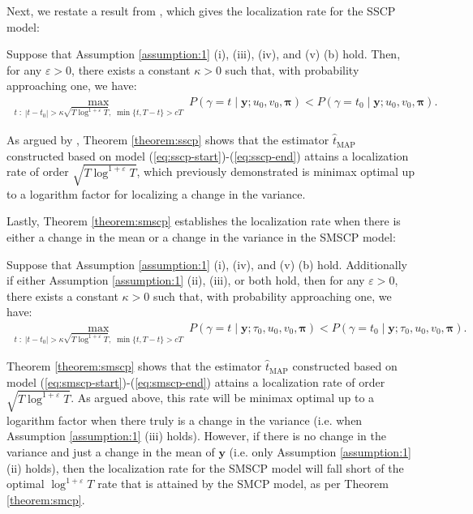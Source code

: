 Next, we restate a result from \cite{Cappello22}, which gives the localization rate for the SSCP model: 
\begin{theorem}\label{theorem:sscp}
    Suppose that Assumption \ref{assumption:1} (i), (iii), (iv), and (v) (b) hold. Then, for any $\varepsilon > 0$, there exists a constant $\kappa > 0$ such that, with probability approaching one, we have:
    \begin{align*}
        \max_{t \;:\; |t - t_0| > \kappa \sqrt{T\log^{1+\varepsilon} T},\;\min\{t,T-t\} > cT} \; P(\gamma = t  \;|\; \mathbf{y} ; u_0,v_0,\pmb{\pi}) < P(\gamma = t_0  \;|\; \mathbf{y} ; u_0,v_0,\pmb{\pi}).
    \end{align*}
\end{theorem}
As argued by \cite{Cappello22}, Theorem \ref{theorem:sscp} shows that the estimator $\hat{t}_{\text{MAP}}$ constructed based on model (\ref{eq:sscp-start})-(\ref{eq:sscp-end}) attains a localization rate of order $\sqrt{T\log^{1+\varepsilon} T}$, which \cite{Wang21} previously demonstrated is minimax optimal up to a logarithm factor for localizing a change in the variance.

Lastly, Theorem \ref{theorem:smscp} establishes the localization rate when there is either a change in the mean or a change in the variance in the SMSCP model:
\begin{theorem}\label{theorem:smscp}
Suppose that Assumption \ref{assumption:1} (i), (iv), and (v) (b) hold. Additionally if either Assumption \ref{assumption:1} (ii), (iii), or both hold, then for any $\varepsilon > 0$, there exists a constant $\kappa > 0$ such that, with probability approaching one, we have:
    \begin{align*}
        \max_{t \;:\; |t - t_0| > \kappa \sqrt{T\log^{1+\varepsilon} T},\;\min\{t,T-t\} > cT} \; P(\gamma = t  \;|\; \mathbf{y} ; \tau_0,u_0,v_0,\pmb{\pi}) < P(\gamma = t_0  \;|\; \mathbf{y} ;\tau_0, u_0,v_0,\pmb{\pi}).
    \end{align*}
\end{theorem}
Theorem \ref{theorem:smscp} shows that the estimator $\hat{t}_{\text{MAP}}$ constructed based on model (\ref{eq:smscp-start})-(\ref{eq:smscp-end}) attains a localization rate of order $\sqrt{T\log^{1+\varepsilon} T}$. As argued above, this rate will be minimax optimal up to a logarithm factor when there truly is a change in the variance (i.e. when Assumption \ref{assumption:1} (iii) holds). However, if there is no change in the variance and just a change in the mean of $\mathbf{y}$ (i.e. only Assumption \ref{assumption:1} (ii) holds), then the localization rate for the SMSCP model will fall short of the optimal $\log^{1+\varepsilon} T$ rate that is attained by the SMCP model, as per Theorem \ref{theorem:smcp}.